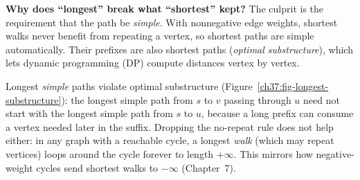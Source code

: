 \begin{whybox}
\textbf{Why does ``longest'' break what ``shortest'' kept?} The culprit is the requirement that the path be
\emph{simple}. With nonnegative edge weights, shortest walks never benefit from repeating a vertex, so shortest paths are simple automatically. Their prefixes are also shortest paths (\emph{optimal substructure}), which lets dynamic programming (DP) compute distances vertex by vertex.

Longest \emph{simple} paths violate optimal substructure (Figure~\ref{ch37:fig-longest-substructure}): the longest simple path from $s$ to $v$ passing through $u$ need not start with the longest simple path from $s$ to $u$, because a long prefix can consume a vertex needed later in the suffix. Dropping the no-repeat rule does not help either: in any graph with a reachable cycle, a longest \emph{walk} (which may repeat vertices) loops around the cycle forever to length $+\infty$. This mirrors how negative-weight cycles send shortest walks to $-\infty$ (Chapter~7).
\end{whybox}

